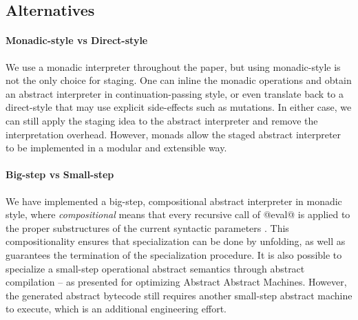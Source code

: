 \subsection{Alternatives}

\paragraph{Monadic-style vs Direct-style} We use a monadic interpreter
throughout the paper, but using monadic-style is not the only choice for
staging. One can inline the monadic operations and obtain an abstract
interpreter in continuation-passing style, or even translate back to a
direct-style that may use explicit side-effects such as mutations. In either
case, we can still apply the staging idea to the abstract interpreter and
remove the interpretation overhead.  However, monads allow the staged abstract
interpreter to be implemented in a modular and extensible way.

\paragraph{Big-step vs Small-step}

We have implemented a big-step, compositional abstract interpreter in monadic
style, where \textit{compositional} means that every recursive call of @eval@ %
is applied to the proper substructures of the current syntactic
parameters \cite{10.1007/3-540-61580-6_11}. This compositionality ensures that
specialization can be done by unfolding, as well as guarantees the termination
of the specialization procedure. It is also possible to specialize a small-step
operational abstract semantics through abstract compilation
\cite{Boucher:1996:ACN:647473.727587} -- as
\citet{Johnson:2013:OAA:2500365.2500604} presented for
optimizing Abstract Abstract Machines. However, the generated abstract
bytecode still requires another small-step abstract machine to execute, which is
an additional engineering effort.
